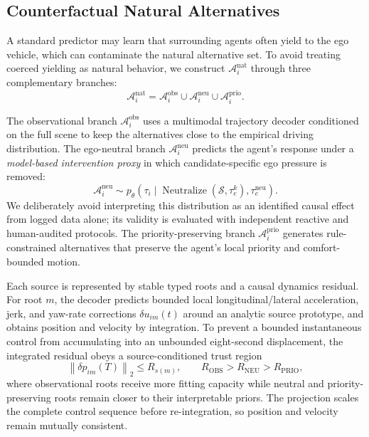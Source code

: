 \documentclass[10pt]{article}
\begin{document}
\subsection{Counterfactual Natural Alternatives}
\label{sec:method_counterfactual}

A standard predictor may learn that surrounding agents often yield to the ego vehicle, which can contaminate the natural alternative set. To avoid treating coerced yielding as natural behavior, we construct $\mathcal{A}^{\mathrm{nat}}_i$ through three complementary branches:
\begin{equation}
    \mathcal{A}^{\mathrm{nat}}_i
    =
    \mathcal{A}^{\mathrm{obs}}_i
    \cup
    \mathcal{A}^{\mathrm{neu}}_i
    \cup
    \mathcal{A}^{\mathrm{prio}}_i .
    \label{eq:natural_union}
\end{equation}

The observational branch $\mathcal{A}^{\mathrm{obs}}_i$ uses a multimodal trajectory decoder conditioned on the full scene to keep the alternatives close to the empirical driving distribution. The ego-neutral branch $\mathcal{A}^{\mathrm{neu}}_i$ predicts the agent's response under a \emph{model-based intervention proxy} in which candidate-specific ego pressure is removed:
\begin{equation}
    \mathcal{A}^{\mathrm{neu}}_i
    \sim
    p_\theta\!\left(\tau_i \mid \operatorname{Neutralize}(\mathcal{S},\tau_e^k),\tau^{\mathrm{neu}}_e\right).
\end{equation}
We deliberately avoid interpreting this distribution as an identified causal effect from logged data alone; its validity is evaluated with independent reactive and human-audited protocols. The priority-preserving branch $\mathcal{A}^{\mathrm{prio}}_i$ generates rule-constrained alternatives that preserve the agent's local priority and comfort-bounded motion.

Each source is represented by stable typed roots and a causal dynamics residual. For root $m$, the decoder predicts bounded local longitudinal/lateral acceleration, jerk, and yaw-rate corrections $\delta u_{im}(t)$ around an analytic source prototype, and obtains position and velocity by integration. To prevent a bounded instantaneous control from accumulating into an unbounded eight-second displacement, the integrated residual obeys a source-conditioned trust region
\begin{equation}
    \left\|\delta p_{im}(T)\right\|_2 \le R_{s(m)},
    \qquad R_{\mathrm{OBS}}>R_{\mathrm{NEU}}>R_{\mathrm{PRIO}},
    \label{eq:natural_trust_region}
\end{equation}
where observational roots receive more fitting capacity while neutral and priority-preserving roots remain closer to their interpretable priors. The projection scales the complete control sequence before re-integration, so position and velocity remain mutually consistent.
\end{document}
